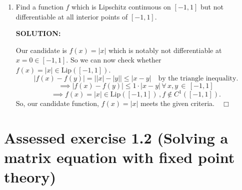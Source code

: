 \documentclass[]{article}
\newcommand{\interior}[1]{%
  {\kern0pt#1}^{\mathrm{o}}%
}
\begin{document}
\begin{enumerate}
Then, fixing $x \in \partial C \text{ and choosing any } \tilde{x} \in \interior{C}, \text{ we define }x_k :=\tilde{x}+k(x-\tilde{x});k\in[0,1) \text{ with } x_k\in \interior{C} \, \forall k\in [0,1) $ by convexity of $C$. Then because $x_k \to x$ as $k \to 1^-$, from the above interior case and continuity of $\|g'\|$ on $C$, we have that:
\[
\|g'(x_k)\| \leq L \quad \forall x\in \partial{C}, k \in [0,1)\]
\[
\implies \|g'(x)\|=\displaystyle \lim_{k\to 1^-} \|g'(x_k)\|  \leq L \quad \forall x\in \partial{C}
\]
\[
\implies \sup_{x\in \partial{C}}\|g'(x)\| \leq L
\]

Combining the above results yields $\displaystyle \sup_{x\in C}\|g'(x)\| \leq L$ since $\partial C \, \cup \, \interior C = C$.

Again combining this with our previously obtained inequality gives:

\[
\sup_{x\in C}\|g'(x)\| \leq |g|_{\text{Lip}(C)}  = \sup_ {x\in C} \|g'(x)\|= \max_{x\in C} \|g'(x)\|
\]
\[
\implies \displaystyle |g|_{\operatorname{Lip}(C)}=\sup_{x\in C}\|g'(x)\|=\max_{x\in C}\|g'(x)\|
\quad \Box
\]




\item Find a function $f$ which is Lipschitz continuous on $[-1,1]$ but not differentiable at all interior points of $[-1,1]$.

\noindent \textbf{SOLUTION:}

Our candidate is $f(x) = |x|$ which is notably not differentiable at $x=0 \in [-1,1]$.\newline
So we can now check whether $f(x) = |x| \in \text{Lip}([-1,1])$.\newline
\[
\left|f(x)-f(y)\right|  = \left||x|-|y|\right| \leq |x-y| \quad \text{by the triangle inequality.}
\]
\[
\implies \left|f(x)-f(y)\right| \leq 1 \cdot |x-y| \, \forall \, x,y \, \in \, [-1,1]
\]
\[
\implies f(x) = |x| \in \text{Lip}([-1,1]) \, , f \notin C^1([-1,1]).
\]
So, our candidate function, $f(x)=|x|$ meets the given criteria.$\quad \Box$

\end{enumerate}


\section*{Assessed exercise 1.2 (Solving a matrix equation with fixed point theory)}
\end{document}
